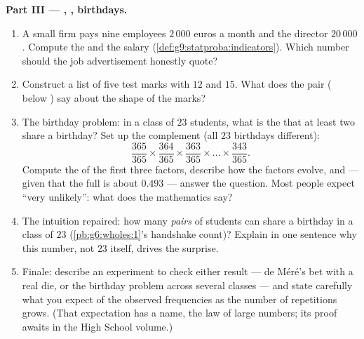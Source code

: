 \begin{problem}
\medskip
\noindent\textbf{Part III --- , , birthdays.}
\begin{enumerate}[resume]
  \item A small firm pays nine employees $2\,000$ euros a month
        and the director $20\,000$. Compute the  and the
         salary (\cref{def:g9:statproba:indicators}).
        Which number should the job advertisement honestly
        quote?
  \item Construct a list of five test marks with  $12$ and
         $15$. What does the pair ( below ) say
        about the shape of the marks?
  \item The birthday problem: in a class of $23$ students, what
        is the  that at least two share a birthday?
        Set up the complement (all $23$ birthdays different):
        \[
        \frac{365}{365} \times \frac{364}{365} \times
        \frac{363}{365} \times \dots \times \frac{343}{365} .
        \]
        Compute the  of the first three factors, describe
        how the factors evolve, and --- given that the full
         is about $0.493$ --- answer the question. Most
        people expect ``very unlikely'': what does the
        mathematics say?
  \item The intuition repaired: how many \emph{pairs} of
        students can share a birthday in a class of $23$
        (\cref{pb:g6:wholes:1}'s handshake count)? Explain in one
        sentence why this number, not $23$ itself, drives the
        surprise.
  \item Finale: describe an experiment to check either result
        --- de M\'er\'e's bet with a real die, or the birthday
        problem across several classes --- and state carefully
        what you expect of the observed frequencies as the number
        of repetitions grows. (That expectation has a name, the
        law of large numbers; its proof awaits in the High
        School volume.)
\end{enumerate}
\end{problem}
